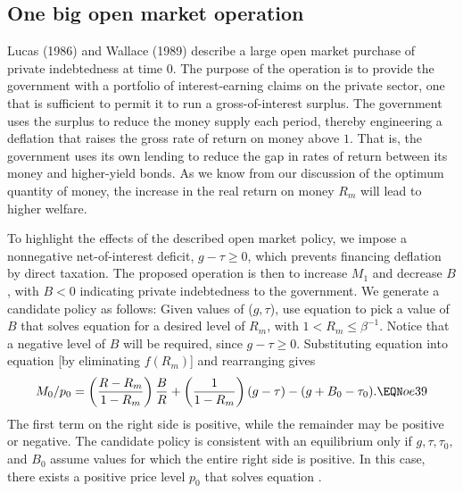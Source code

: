 \subsection{One big open market operation}
Lucas (1986) and Wallace (1989) describe  a  large open market
purchase of private indebtedness at time 0.  The purpose of the
operation is to provide the government with a portfolio of
interest-earning claims on the private sector, one that is
sufficient to permit it to run a gross-of-interest surplus.  The
government uses the surplus to reduce the money supply each
period, thereby engineering a deflation that raises the gross rate of
return on money above $1$. That is, the government uses its own
lending to reduce the gap in rates of return between its money and
higher-yield bonds. As we know from our discussion of the optimum
quantity of money, the increase in the real return on money $R_m$
will lead to higher
 welfare.


To highlight the effects of the described open market policy, we
impose a nonnegative net-of-interest deficit, $g-\tau\geq 0$,
which prevents financing deflation by direct taxation.
The proposed operation is then to
increase $M_1$ and decrease $B$, with $B<0$ indicating
private indebtedness to the government. We generate a candidate
policy as follows:
Given values of ($g,\tau$), use equation 
to pick a value of $B$ that solves equation
 for a desired level of $R_m$, with
$1 < R_m \leq \beta^{-1}$.  Notice that
a negative level of $B$ will be required, since $g-\tau\geq 0$.
Substituting equation  into equation 
[by eliminating $f(R_m)$] and rearranging gives
$$ M_0/p_0 = \left({R-R_m\over 1-R_m}\right){B\over R} +
         \left({1\over 1-R_m}\right) (g-\tau) -
             (g+B_0-\tau_0) . \EQN oe39$$
The first term on the right side is positive,
while the remainder may be positive or negative.  The candidate
policy is  consistent with an equilibrium only if
$g,\tau,\tau_0,$ and $B_0$ assume values for which the
entire right side is positive.  In this case, there exists
a positive price level $p_0$ that solves equation .



